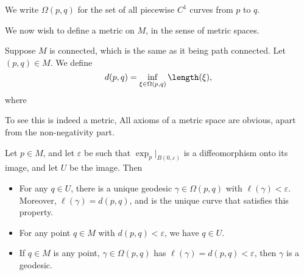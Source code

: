 \documentclass[a4paper]{article}
\begin{document}
\begin{notation}
  We write $\Omega(p, q)$ for the set of all piecewise $C^1$ curves from $p$ to $q$.
\end{notation}

We now wish to define a metric on $M$, in the sense of metric spaces.
\begin{defi}[Distance]
  Suppose $M$ is connected, which is the same as it being path connected. Let $(p, q) \in M$. We define
  \[
    d(p, q) = \inf_{\xi \in \Omega(p, q)} \length(\xi),
  \]
  where
\end{defi}
To see this is indeed a metric, All axioms of a metric space are obvious, apart from the non-negativity part.
\begin{thm}
  Let $p \in M$, and let $\varepsilon$ be such that $\exp_p|_{B(0, \varepsilon)}$ is a diffeomorphism onto its image, and let $U$ be the image. Then
  \begin{itemize}
    \item For any $q \in U$, there is a unique geodesic $\gamma \in \Omega(p, q)$ with $\ell(\gamma) < \varepsilon$. Moreover, $\ell(\gamma) = d(p, q)$, and is the unique curve that satisfies this property.
    \item For any point $q \in M$ with $d(p, q) < \varepsilon$, we have $q \in U$.
    \item If $q \in M$ is any point, $\gamma \in \Omega(p, q)$ has $\ell(\gamma) = d(p, q) < \varepsilon$, then $\gamma$ is a geodesic.
  \end{itemize}
\end{thm}
\end{document}
